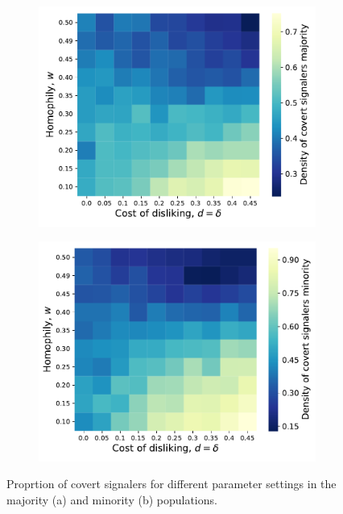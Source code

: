 \documentclass[11pt,letterpaper]{article}
\begin{document}
\begin{figure}[H]
  \centering
  \begin{subfigure}{0.49\textwidth}
    \centering
    \includegraphics[width=\textwidth]{prelim/Figures/majority_signalers_025.pdf}
    \caption{}
    \label{fig:}
  \end{subfigure}
  \begin{subfigure}{0.49\textwidth}
    \centering
    \includegraphics[width=\textwidth]{prelim/Figures/minority_signalers_025.pdf}
    \caption{}
    \label{fig:}
  \end{subfigure}
  \caption{Proprtion of covert signalers for different parameter settings in the
    majority (a) and minority (b) populations.}
  \label{fig:regressions}
\end{figure}
\end{document}
